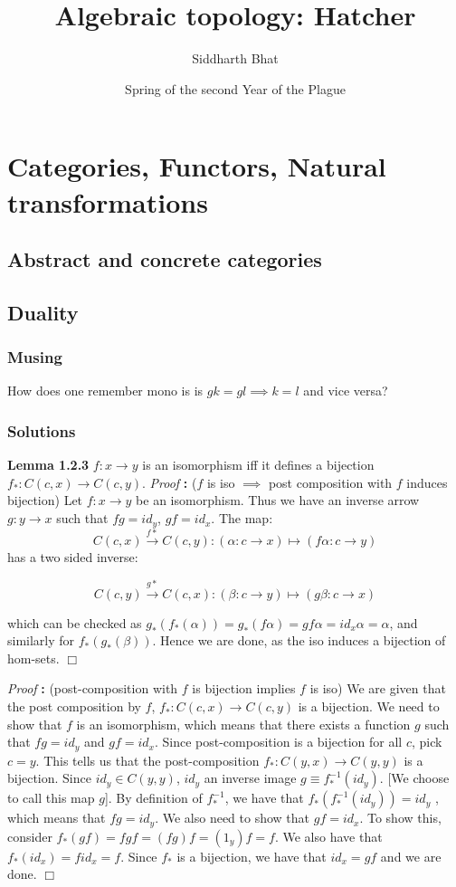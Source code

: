 \documentclass[11pt]{book}
\title{Algebraic topology: Hatcher}
\author{Siddharth Bhat}
\date{Spring of the second Year of the Plague}
\def\qed{$\Box$}
\newcommand{\beginproof}[1][]{\emph{Proof #1}\textbf{:} }
\newcommand{\question}[1]{\textbf{#1}}
\begin{document}
\maketitle
\tableofcontents
\chapter{Categories, Functors, Natural transformations}
\section{Abstract and concrete categories}
\section{Duality}

\subsection{Musing}
How does one remember mono is is $gk = gl \implies k = l$ and vice versa?

\subsection{Solutions}
\question{Lemma 1.2.3} $f: x \to y$ is an isomorphism iff it defines a bijection $f_*: C(c, x) \to C(c, y)$.
\beginproof{($f$ is iso $\implies$ post composition with $f$ induces bijection)}
Let $f: x \to y$ be an isomorphism. Thus we have an inverse arrow $g: y \to x$ such that $fg = id_y$, $gf = id_x$.
The map: $$C(c, x) \xrightarrow{f*} C(c, y): (\alpha: c \to x) \mapsto (f\alpha: c \to y)$$
has a two sided inverse:

$$
C(c, y) \xrightarrow{g*} C(c, x): (\beta: c \to y) \mapsto (g\beta: c \to x)
$$

which can be checked as $g_*(f_*(\alpha)) = g_*(f\alpha) = gf\alpha = id_x\alpha = \alpha$, and similarly for $f_*(g_*(\beta))$.
Hence we are done, as the iso induces a bijection of hom-sets.
\qed


\beginproof{(post-composition with $f$ is bijection implies $f$ is iso)}
We are given that the post composition by $f$, $f_*: C(c, x) \rightarrow C(c, y)$ is a bijection.
We need to show that $f$ is an isomorphism, which means that there exists a function $g$ such that $fg = id_y$ and $gf = id_x$.
Since post-composition is a bijection for all $c$, pick $c = y$. This tells us that the post-composition 
$f_*: C(y, x) \rightarrow C(y, y)$ is a bijection. Since $id_y \in C(y, y)$, $id_y$ an inverse image $g \equiv f_*^{-1}(id_y)$. 
[We choose to call this map $g$]. By definition of $f_*^{-1}$, we have that $f_*(f_*^{-1}(id_y)) = id_y$ , which means
that $fg = id_y$. We also need to show that $gf = id_x$. To show this, consider $f_*(gf) = fgf = (fg)f = (1_y)f = f$.
We also have that $f_*(id_x) = f id_x = f$. Since $f_*$ is a bijection, we have that $id_x = gf$ and we are done.  \qed
\end{document}
